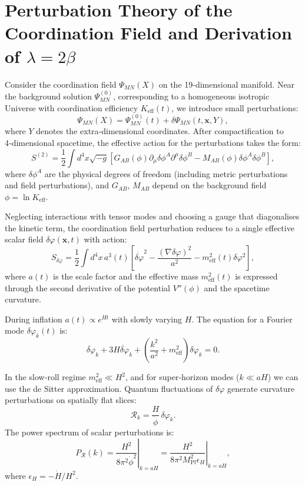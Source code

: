 \documentclass[12pt]{article}
\theoremstyle{remark}
\newcommand{\Keff}{K_{\mathrm{eff}}}
\newcommand{\Mpl}{M_{\mathrm{Pl}}}
\begin{document}
	\appendix
	\section{Perturbation Theory of the Coordination Field and Derivation of $\lambda = 2\beta$}
	\label{app:perturbations}
	
	Consider the coordination field $\Psi_{MN}(X)$ on the 19‑dimensional manifold. Near the background solution $\Psi^{(0)}_{MN}$, corresponding to a homogeneous isotropic Universe with coordination efficiency $\Keff(t)$, we introduce small perturbations:
	\begin{equation}
		\Psi_{MN}(X) = \Psi^{(0)}_{MN}(t) + \delta\Psi_{MN}(t,\mathbf{x},Y),
	\end{equation}
	where $Y$ denotes the extra‑dimensional coordinates. After compactification to 4‑dimensional spacetime, the effective action for the perturbations takes the form:
	\begin{equation}
		S^{(2)} = \frac{1}{2} \int d^4x \sqrt{-g} \left[ G_{AB}(\phi) \partial_\mu \delta\phi^A \partial^\mu \delta\phi^B - M_{AB}(\phi) \delta\phi^A \delta\phi^B \right],
	\end{equation}
	where $\delta\phi^A$ are the physical degrees of freedom (including metric perturbations and field perturbations), and $G_{AB}$, $M_{AB}$ depend on the background field $\phi = \ln\Keff$.
	
	Neglecting interactions with tensor modes and choosing a gauge that diagonalises the kinetic term, the coordination field perturbation reduces to a single effective scalar field $\delta\varphi(\mathbf{x},t)$ with action:
	\begin{equation}
		S_{\delta\varphi} = \frac{1}{2} \int d^4x \, a^3(t) \left[ \dot{\delta\varphi}^2 - \frac{(\nabla\delta\varphi)^2}{a^2} - m_{\mathrm{eff}}^2(t) \delta\varphi^2 \right],
	\end{equation}
	where $a(t)$ is the scale factor and the effective mass $m_{\mathrm{eff}}^2(t)$ is expressed through the second derivative of the potential $V''(\phi)$ and the spacetime curvature.
	
	During inflation $a(t) \propto e^{Ht}$ with slowly varying $H$. The equation for a Fourier mode $\delta\varphi_k(t)$ is:
	\begin{equation}
		\ddot{\delta\varphi}_k + 3H\dot{\delta\varphi}_k + \left( \frac{k^2}{a^2} + m_{\mathrm{eff}}^2 \right) \delta\varphi_k = 0.
	\end{equation}
	
	In the slow‑roll regime $m_{\mathrm{eff}}^2 \ll H^2$, and for super‑horizon modes ($k \ll aH$) we can use the de Sitter approximation. Quantum fluctuations of $\delta\varphi$ generate curvature perturbations on spatially flat slices:
	\begin{equation}
		\mathcal{R}_k = \frac{H}{\dot{\phi}} \, \delta\varphi_k.
	\end{equation}
	The power spectrum of scalar perturbations is:
	\begin{equation}
		P_{\mathcal{R}}(k) = \left. \frac{H^2}{8\pi^2 \dot{\phi}^2} \right|_{k=aH} = \left. \frac{H^2}{8\pi^2 \Mpl^2 \epsilon_H} \right|_{k=aH},
	\end{equation}
	where $\epsilon_H = -\dot{H}/H^2$.
	
\end{document}
